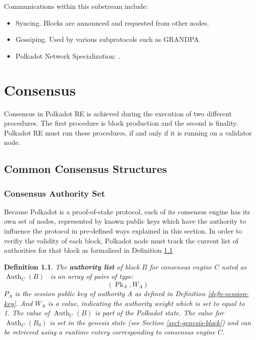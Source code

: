 \documentclass{book}
\newcommand{\tmop}[1]{\ensuremath{\operatorname{#1}}}
\newcommand{\tmstrong}[1]{\textbf{#1}}
\newcommand{\tmtextbf}[1]{{\bfseries{#1}}}
\newcommand{\tmtexttt}[1]{{\ttfamily{#1}}}
\newcommand{\tmverbatim}[1]{{\ttfamily{#1}}}
\newtheorem{definition}{Definition}
\providecommand{\tmop}[1]{\ensuremath{\mathrm{#1}}}
\providecommand{\tmstrong}[1]{\tmtextbf{#1}}
\providecommand{\tmtextbf}[1]{\tmtextbf{#1}}
\providecommand{\tmverbatim}[1]{\tmtexttt{#1}}
\newtheorem{definition}{Definition}
\begin{document}
Communications within this substream include:
\begin{itemize}
  \item Syncing. Blocks are announced and requested from other nodes.
  
  \item Gossiping. Used by various subprotocols such as GRANDPA.
  
  \item Polkadot Network Specialization: {}.
\end{itemize}
\chapter{Consensus}\label{chap-consensu}

Consensus in Polkadot RE is achieved during the execution of two different
procedures. The first procedure is block production and the second is
finality. Polkadot RE must run these procedures, if and only if it is running
on a validator node.

\section{Common Consensus Structures}

\subsection{Consensus Authority Set}\label{sect-authority-set}

Because Polkadot is a proof-of-stake protocol, each of its consensus engine
has its own set of nodes, represented by known public keys which have the
authority to influence the protocol in pre-defined ways explained in this
section. In order to verifiy the validity of each block, Polkadot node must
track the current list of authorities for that block as formalised in
Definition \ref{defn-authority-list}

\begin{definition}
  \label{defn-authority-list}The {\tmstrong{authority list}} of block $B$ for
  consensus engine $C$ noted as {\tmstrong{$\tmop{Auth}_C (B)$}} \ is an array
  of pairs of type:
  \[ (\tmop{Pk}_A, W_A) \]
  $P_A$ is the session public key of authority A as defined in Definition
  \ref{defn-session-key}. And $W_A$ is a \tmverbatim{u64} value, indicating
  the authority weight which is set to equal to 1. The value of $\tmop{Auth}_C
  (B)$ is part of the Polkadot state. The value for $\tmop{Auth}_C (B_0)$ is
  set in the genesis state (see Section \ref{sect-genesis-block}) and can be
  retrieved using a runtime entery corresponding to consensus engine $C$.
\end{definition}
\end{document}
